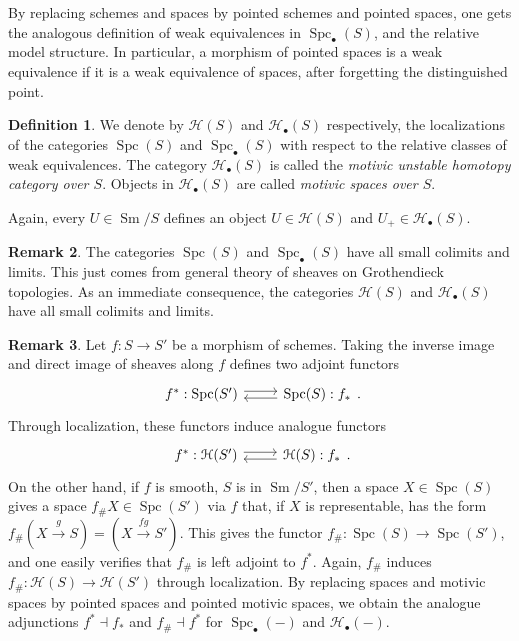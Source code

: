 \documentclass[10pt]{amsart}
\theoremstyle{definition}
\newtheorem{defn}{Definition}[section]
\newtheorem{rmk}[defn]{Remark}
\theoremstyle{plain}
\numberwithin{equation}{section}
\newcommand{\0}{\emptyset}
\newcommand{\sH}{{\mathcal H}}
\newcommand{\Spc}{{\operatorname{Spc}}}
\newcommand{\Sm}{{\operatorname{Sm}}}
\begin{document}
By replacing schemes and spaces by pointed schemes and pointed spaces, one gets the analogous definition of weak equivalences in $\Spc_{\bullet}(S)$, and the relative model structure. In particular, a morphism of pointed spaces is a weak equivalence if it is a weak equivalence of spaces, after forgetting the distinguished point.
\begin{defn}
    We denote by $\sH(S)$ and $\sH_{\bullet}(S)$ respectively, the localizations of the categories $\Spc(S)$ and $\Spc_{\bullet}(S)$ with respect to the relative classes of weak equivalences. The category $\sH_{\bullet}(S)$ is called the \emph{motivic unstable homotopy category over $S$}. Objects in $\sH_{\bullet}(S)$ are called \emph{motivic spaces over $S$}.  
\end{defn}

Again, every $U \in \Sm/S$ defines an object $U \in \sH(S)$ and $U_+ \in \sH_{\bullet}(S)$.

\begin{rmk}
\label{rmk:colims}
    The categories $\Spc(S)$ and $\Spc_{\bullet}(S)$ have all small colimits and limits. This just comes from general theory of sheaves on Grothendieck topologies. As an immediate consequence, the categories $\sH(S)$ and $\sH_{\bullet}(S)$ have all small colimits and limits.
\end{rmk}

\begin{rmk}
\label{rmk:unstablefunctors}
   Let $f:S\to S'$ be a morphism of schemes. Taking the inverse image and direct image of sheaves along $f$ defines two adjoint functors
   $$ \begin{tikzcd}
    f^*: \Spc(S') \arrow[r, shift left] & \Spc(S): f_* \arrow[l, shift left]
    \end{tikzcd}.$$
    Through localization, these functors induce analogue functors
    $$ \begin{tikzcd}
    f^*: \sH(S') \arrow[r, shift left] & \sH(S): f_* \arrow[l, shift left]
    \end{tikzcd}.$$
    On the other hand, if $f$ is smooth, $S$ is in $\Sm/S'$, then a space $X \in \Spc(S)$ gives a space $f_\# X \in \Spc(S')$ via $f$ that, if $X$ is representable, has the form $f_\#(X \xrightarrow{g} S) = (X \xrightarrow{fg} S')$. This gives the functor $f_\#:\Spc(S)\to \Spc(S')$, and one easily verifies that $f_\#$ is left adjoint to $f^*$. Again, $f_\#$ induces $f_\#:\sH(S) \to \sH(S')$ through localization. By replacing spaces and motivic spaces by pointed spaces and pointed motivic spaces, we obtain the analogue adjunctions $f^* \dashv f_*$ and $f_\# \dashv f^*$ for $\Spc_{\bullet}(-)$ and $\sH_{\bullet}(-)$.
\end{rmk}
\end{document}
